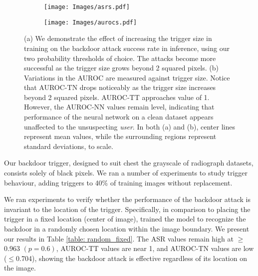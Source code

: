 \documentclass[letterpaper]{article} %
\begin{document}
\begin{figure*}[!h]
\begin{center}
\begin{subfigure}{.45\textwidth}
  \centering
  \texttt{[image: Images/asrs.pdf]}  
  \caption{} %
  \label{fig:asrs}
\end{subfigure}
\begin{subfigure}{.45\textwidth}
  \centering
  \texttt{[image: Images/aurocs.pdf]}  
  \caption{} %
  \label{fig:aurocs}
\end{subfigure}
\caption{(a) We demonstrate the effect of increasing the trigger size in training on the backdoor attack success rate in inference, using our two probability thresholds of choice. The attacks become more successful as the trigger size grows beyond 2 squared pixels. (b) Variations in the AUROC are measured against trigger size.  Notice that AUROC-TN drops noticeably as the trigger size increases beyond 2 squared pixels. AUROC-TT approaches value of 1. However, the AUROC-NN values remain level, indicating that performance of the neural network on a clean dataset appears unaffected to the unsuspecting \textit{user}. In both (a) and (b), center lines represent mean values, while the surrounding regions represent standard deviations, to scale.}
\label{fig:asrsaurocs}
\end{center}
\end{figure*}

Our backdoor trigger, designed to suit chest the grayscale of radiograph datasets, consists solely of black pixels.  We ran a number of experiments to study trigger behaviour, adding triggers to 40\% of training images without replacement.
 
We ran experiments to verify whether the performance of the backdoor attack is invariant to the location of the trigger. Specifically, in comparison to placing the trigger in a fixed location (center of image), trained the model to recognize the backdoor in a randomly chosen location within the image boundary. We present our results in Table \ref{table: random_fixed}. The ASR values remain high at $\geq$0.963  $(p=0.6)$, AUROC-TT values are near 1, and AUROC-TN values are low ($\leq$0.704), showing the backdoor attack is effective regardless of its location on the image.
    
\end{document}
